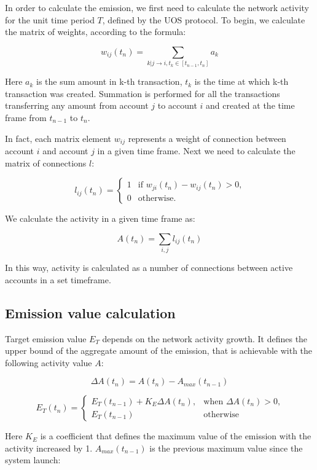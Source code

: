 \documentclass[a4paper,12pt]{article}
\begin{document}
In order to calculate the emission, we first need to calculate the network activity for the unit time period $T$, defined by the U{\degree}OS protocol. To begin, we calculate the matrix of weights, according to the formula:



$$
w_{ij}(t_n)=\sum_{k|j \to i, t_k \in [t_{n-1}, t_n]}a_k
$$

Here $a_k$  is the sum amount in k-th transaction, $t_k$ is the time at which k-th transaction was created. Summation is performed for all the transactions transferring any amount from account $j$ to account $i$ and created at the time frame from $t_{n-1}$ to $t_n$. 

In fact, each matrix element $w_{ij}$ represents a weight of connection between account $i$ and account $j$ in a given time frame. Next we need to calculate the matrix of connections $l$: 



$$
l_{ij}(t_n) = \begin{cases}
 1
 & \text{if $w_{ji}(t_n)-w_{ij}(t_n) > 0$,}\\
 0 & \text{otherwise.}
\end{cases}
$$

We calculate the activity in a given time frame as:



$$
A(t_n) = \sum_{i,j} l_{ij}(t_n)
$$

In this way, activity is calculated as a number of connections between active accounts in a set timeframe. 



\subsection{Emission value calculation}

Target emission value $E_T$ depends on the network activity growth. It defines the upper bound of the aggregate amount of the emission, that is achievable with the following activity value $A$:



$$
\Delta A(t_n) = A(t_n) - A_{max}(t_{n-1})
$$

$$
E_T(t_n) = \begin{cases}
 E_T(t_{n-1}) + K_E \Delta A(t_n),
 & \text{when $\Delta A(t_n) > 0$,}\\
 E_T(t_{n-1}) & \text{otherwise}
\end{cases}
$$

Here $K_E$ is a coefficient that defines the maximum value of the emission with the activity increased by 1. $A_{max}(t_{n-1})$ is the previous maximum value since the system launch:
\end{document}

